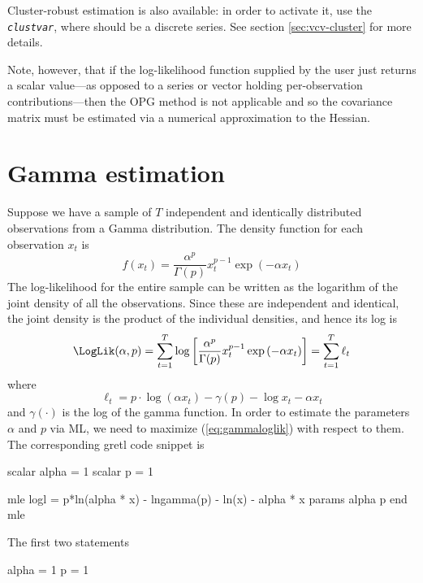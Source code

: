 Cluster-robust estimation is also available: in order to activate it,
use the \emph{\texttt{clustvar}}, where 
should be a discrete series. See section \ref{sec:vcv-cluster} for
more details.

Note, however, that if the log-likelihood function supplied by the
user just returns a scalar value---as opposed to a series or vector
holding per-observation contributions---then the OPG method is not
applicable and so the covariance matrix must be estimated via a
numerical approximation to the Hessian.

\section{Gamma estimation}
\label{sec:ml-gamma}

Suppose we have a sample of $T$ independent and identically
distributed observations from a Gamma distribution. The density
function for each observation $x_t$ is
\begin{equation}
  \label{eq:gammadens}
  f(x_t) = \frac{\alpha^p}{\Gamma(p)} x_t^{p-1} \exp\left({-\alpha
      x_t}\right)
\end{equation}
The log-likelihood for the entire sample can be written as the
logarithm of the joint density of all the observations. Since these
are independent and identical, the joint density is the product of the
individual densities, and hence its log is
\begin{equation}
  \label{eq:gammaloglik}
  \LogLik(\alpha, p) = \sum_{t=1}^T \log \left[ \frac{\alpha^p}{\Gamma(p)} x_t^{p-1} \exp\left({-\alpha
      x_t}\right) \right] = 
      \sum_{t=1}^T \ell_t
\end{equation}
where 
\[
  \ell_t = p \cdot \log (\alpha x_t) - \gamma(p) - \log x_t - \alpha x_t
\]
and $\gamma(\cdot)$ is the log of the gamma function.  In order to
estimate the parameters $\alpha$ and $p$ via ML, we need to maximize
(\ref{eq:gammaloglik}) with respect to them. The corresponding
gretl code snippet is

\begin{code}
scalar alpha = 1
scalar p = 1

mle logl =  p*ln(alpha * x) - lngamma(p) - ln(x) - alpha * x 
  params alpha p
end mle 
\end{code}

The first two statements

\begin{code}
alpha = 1
p = 1
\end{code}

